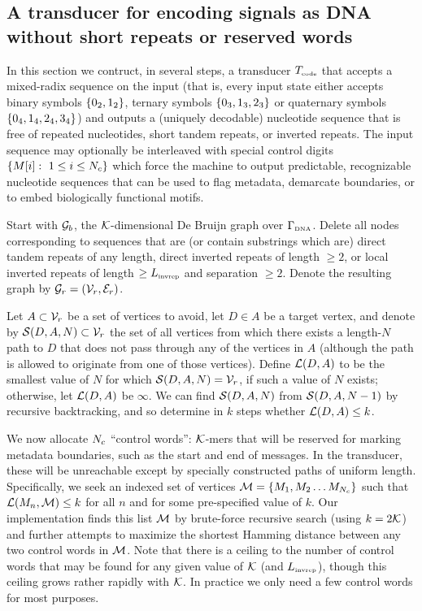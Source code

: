 \documentclass[english]{article}
\begin{document}
\subsection{A transducer for encoding signals as DNA without short repeats or reserved words}

In this section we contruct, in several steps, a transducer $T_{\mbox{\tiny code}}$
that accepts a mixed-radix sequence on the input
(that is, every input state either accepts binary symbols $\{ 0_2, 1_2 \}$,
ternary symbols $\{ 0_3, 1_3, 2_3 \}$ or
quaternary symbols $\{ 0_4, 1_4, 2_4, 3_4 \}$)
and outputs a (uniquely decodable) nucleotide sequence that is free of
repeated nucleotides, short tandem repeats, or inverted repeats.
The input sequence may optionally be interleaved with special control digits
$\{ M[{i}]:\ 1 \leq i \leq N_c \}$
which force the machine to output predictable, recognizable nucleotide sequences
that can be used to flag metadata, demarcate boundaries,
or to embed biologically functional motifs.

Start with ${\cal G}_b$, the ${\cal K}$-dimensional De Bruijn graph over $\Gamma_{\mbox{\tiny DNA}}$.
Delete all nodes corresponding to sequences that are (or contain substrings which are)
direct tandem repeats of any length,
direct inverted repeats of length $\geq 2$,
or local inverted repeats of length $\geq L_{\mbox{\tiny invrep}}$ and separation $\geq 2$.
Denote the resulting graph by ${\cal G}_r = ({\cal V}_r,{\cal E}_r)$.

Let $A \subset {\cal V}_r$ be a set of vertices to avoid,
let $D \in A$ be a target vertex,
and denote by ${\cal S}(D,A,N) \subset {\cal V}_r$
the set of all vertices
from which there exists a length-$N$ path to $D$
that does not pass through any of the vertices in $A$
(although the path is allowed to originate from one of those vertices).
Define ${\cal L}(D,A)$ to be the smallest value of $N$ for which ${\cal S}(D,A,N) = {\cal V}_r$,
if such a value of $N$ exists; otherwise, let ${\cal L}(D,A)$ be $\infty$.
We can find ${\cal S}(D,A,N)$ from ${\cal S}(D,A,N-1)$ by recursive backtracking,
and so determine in $k$ steps whether ${\cal L}(D,A) \leq k$.

We now allocate $N_c$ ``control words'': ${\cal K}$-mers
that will be reserved for marking metadata boundaries,
such as the start and end of messages.
In the transducer, these will be unreachable except by specially constructed paths of uniform length.
Specifically, we seek an indexed set of vertices
${\cal M} = \{ M_1, M_2 \ldots M_{N_c} \}$
such that ${\cal L}(M_n,{\cal M}) \leq k$ for all $n$
and for some pre-specified value of $k$.
Our implementation finds this list ${\cal M}$ by brute-force recursive search
(using $k = 2{\cal K}$)
and further attempts to maximize the shortest Hamming distance between any two control words in ${\cal M}$.
Note that there is a ceiling to the number of control words that may be found
for any given value of ${\cal K}$ (and $L_{\mbox{\tiny invrep}}$),
though this ceiling grows rather rapidly with ${\cal K}$.
In practice we only need a few control words for most purposes.
\end{document}
